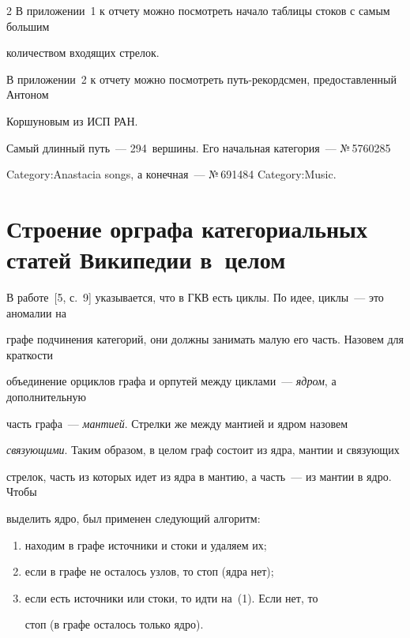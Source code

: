 \begin{multicols}{2}
   В приложении~1 к отчету можно посмотреть начало таблицы стоков с самым большим 

количеством входящих стрелок.

   

   В приложении~2 к отчету можно посмотреть путь-рекордсмен, предоставленный Антоном 

Коршуновым из ИСП РАН.

   

   Самый длинный путь~--- 294~вершины. Его начальная категория~--- №\,5760285 

Category:Anastacia songs, а конечная~--- №\,691484 Category:Music. 



\section{Строение орграфа категориальных статей Википедии в~целом}



   В работе~[5, с.~9] указывается, что в ГКВ есть циклы. По идее, циклы~--- это аномалии на 

графе подчинения категорий, они долж\-ны занимать малую его часть. Назовем для краткости 

объединение орциклов графа и орпутей между циклами~--- \textit{ядром}, а дополнительную 

часть графа~--- \textit{мантией}. Стрелки же между мантией и ядром назовем 

\textit{связующими}. Таким образом, в целом граф состоит из ядра, мантии и связующих 

стрелок, часть из которых идет из ядра в мантию, а часть~--- из мантии в ядро. Чтобы 

выделить ядро, был применен следующий алгоритм: 

   \begin{enumerate}[(1)]

   \item находим в графе источники и стоки и удаляем их; 

   \item если в графе не осталось узлов, то стоп (ядра нет);

   \item если есть источники или стоки, то идти на~(1). Если нет, то

   стоп (в графе осталось только ядро).

   \end{enumerate}


\end{multicols}
